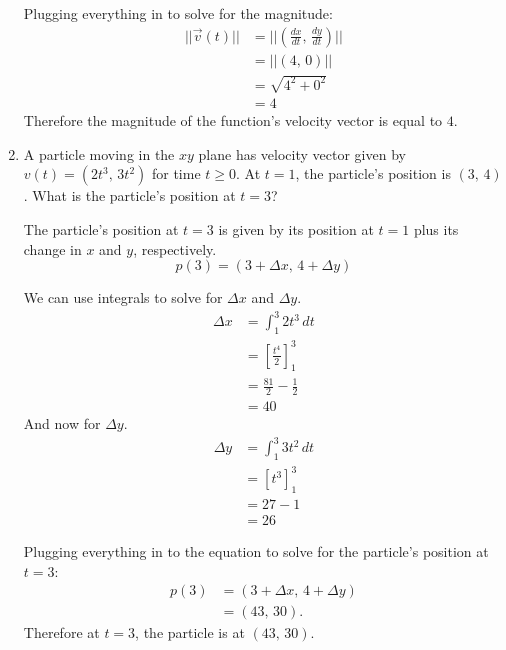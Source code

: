 \documentclass[12pt]{article}
\begin{document}
\begin{enumerate}
          Plugging everything in to solve for the magnitude:
          \begin{align*}
              ||\vec{v}(t)|| & = ||(\frac{dx}{dt}, \, \frac{dy}{dt})|| \\[6pt]
                             & = ||(4, \, 0)||                         \\
                             & = \sqrt{4^2 + 0^2}                      \\
                             & = 4
          \end{align*}
          Therefore the magnitude of the function's velocity vector is equal to $4$.
          \bigskip

    \item A particle moving in the $xy$ plane has velocity vector given by $v(t) = (2t^3, \, 3t^2)$ for time $t \ge 0$. At $t=1$, the particle's position is $(3, \, 4)$. What is the particle's position at $t=3$?

          The particle's position at $t=3$ is given by its position at $t=1$ plus its change in $x$ and $y$, respectively.
          \[ p(3) = (3 + \Delta x, \, 4 + \Delta y) \]

          We can use integrals to solve for $\Delta x$ and $\Delta y$.
          \begin{align*}
              \Delta x & = \int_1^3 2t^3 \, dt              \\
                       & = \left[ \frac{t^4}{2} \right]_1^3 \\[6pt]
                       & = \frac{81}{2} - \frac{1}{2}       \\[6pt]
                       & = 40
          \end{align*}
          And now for $\Delta y$.
          \begin{align*}
              \Delta y & = \int_1^3 3t^2 \, dt    \\
                       & = \left[ t^3 \right]_1^3 \\
                       & = 27 - 1                 \\
                       & = 26
          \end{align*}

          Plugging everything in to the equation to solve for the particle's position at $t=3$:
          \begin{align*}
              p(3) & = (3 + \Delta x, \, 4 + \Delta y) \\
                   & = (43, \, 30).
          \end{align*}
          Therefore at $t=3$, the particle is at $(43, \, 30)$.
\end{enumerate}
\end{document}
